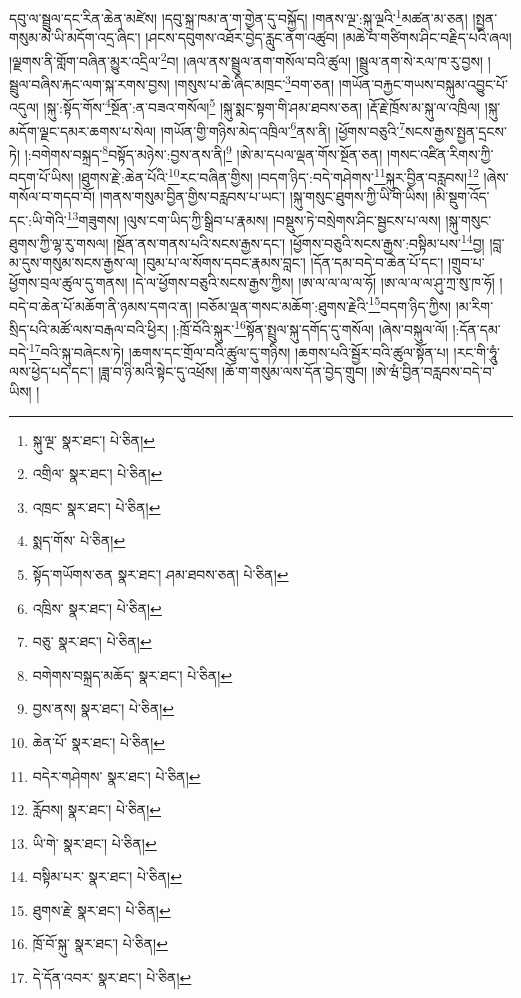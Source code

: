 དབུ་ལ་སྦྲུལ་དང་རིན་ཆེན་མཛེས། །དབུ་སྐྲ་ཁམ་ན་ག་གྱེན་དུ་བསྐྱོད། །གནས་ལྔ་:སྐུ་ལྔའི་\footnote{སྐུ་ལྔ་  སྣར་ཐང་།  པེ་ཅིན། }མཚན་མ་ཅན། །སྤྱན་གསུམ་མེ་ཡི་མདོག་འདྲ་ཞིང་། །ཤངས་དབུགས་འཐོར་བྱེད་རླུང་ནག་འཚུབ། །མཆེ་བ་གཙིགས་ཤིང་བརྗིད་པའི་ཞལ། །ལྗགས་ནི་གློག་བཞིན་མྱུར་འདྲིལ་\footnote{འགྲིལ་  སྣར་ཐང་།  པེ་ཅིན། }བ། །ཞལ་ནས་སྦྲུལ་ནག་གསོལ་བའི་ཚུལ། །སྦྲུལ་ནག་སེ་རལ་ཁ་རུ་བྱས། །སྦྲུལ་བཞིས་རྐང་ལག་སྐ་རགས་བྱས། །གསུས་པ་ཆེ་ཞིང་མཁྲང་\footnote{འཁྲང་  སྣར་ཐང་།  པེ་ཅིན། }བག་ཅན། །གཡོན་བརྐྱང་གཡས་བསྐུམ་འབྱུང་པོ་འདུལ། །སྐུ་:སྟོད་གོས་\footnote{སྨད་གོས་  པེ་ཅིན། }སྔོན་:ན་བཟའ་གསོལ།\footnote{སྟོད་གཡོགས་ཅན  སྣར་ཐང་། ཤམ་ཐབས་ཅན།  པེ་ཅིན། } །སྐུ་སྨང་སྟག་གི་ཤམ་ཐབས་ཅན། །རྡོ་རྗེ་ཁྲོས་མ་སྐུ་ལ་འཁྲིལ། །སྐུ་མདོག་ལྗང་དམར་ཆགས་པ་སེལ། །གཡོན་གྱི་གཉིས་མེད་འཁྲིལ་\footnote{འཁྲིས་  སྣར་ཐང་།  པེ་ཅིན། }ནས་ནི། །ཕྱོགས་བཅུའི་\footnote{བཅུ་  སྣར་ཐང་།  པེ་ཅིན། }སངས་རྒྱས་སྤྱན་དྲངས་ཏེ། །:བགེགས་བསྐྲད་\footnote{བགེགས་བསྐྲད་མཆོད་  སྣར་ཐང་།  པེ་ཅིན། }བསྟོད་མཉེས་:བྱས་ནས་ནི།\footnote{བྱས་ནས།  སྣར་ཐང་།  པེ་ཅིན། } །ཨེ་མ་དཔལ་ལྡན་གོས་སྔོན་ཅན། །གསང་འཛིན་རིགས་ཀྱི་བདག་པོ་ཡིས། །ཐུགས་རྗེ་:ཆེན་པོའི་\footnote{ཆེན་པོ་  སྣར་ཐང་།  པེ་ཅིན། }རང་བཞིན་གྱིས། །བདག་ཉིད་:བདེ་གཤེགས་\footnote{བདེར་གཤེགས་  སྣར་ཐང་།  པེ་ཅིན། }སྐུར་བྱིན་བརླབས།\footnote{རློབས།  སྣར་ཐང་།  པེ་ཅིན། } །ཞེས་གསོལ་བ་གདབ་བོ། །གནས་གསུམ་བྱིན་གྱིས་བརླབས་པ་ཡང་། །སྐུ་གསུང་ཐུགས་ཀྱི་ཡི་གེ་ཡིས། །མི་སྡུག་འོད་དང་:ཡི་གེའི་\footnote{ཡི་གེ་  སྣར་ཐང་།  པེ་ཅིན། }གཟུགས། །ལུས་ངག་ཡིད་ཀྱི་སྒྲིབ་པ་རྣམས། །བསྡུས་ཏེ་བསྲེགས་ཤིང་སྦྱངས་པ་ལས། །སྐུ་གསུང་ཐུགས་ཀྱི་ལྷ་རུ་གསལ། །སྔོན་ནས་གནས་པའི་སངས་རྒྱས་དང་། །ཕྱོགས་བཅུའི་སངས་རྒྱས་:བསྟིམ་པས་\footnote{བསྟིམ་པར་  སྣར་ཐང་།  པེ་ཅིན། }བྱ། །བླ་མ་དུས་གསུམ་སངས་རྒྱས་ལ། །བུམ་པ་ལ་སོགས་དབང་རྣམས་བླང་། །དོན་དམ་བདེ་བ་ཆེན་པོ་དང་། །གྲུབ་པ་ཕྱོགས་བྲལ་ཚུལ་དུ་གནས། །དེ་ལ་ཕྱོགས་བཅུའི་སངས་རྒྱས་ཀྱིས། །ཨ་ལ་ལ་ལ་ལ་ཧོ། །ཨ་ལ་ལ་ལ་ཤུ་ཀྲ་སུ་ཁ་ཧོ། །བདེ་བ་ཆེན་པོ་མཆོག་ནི་ཉམས་དགའ་ན། །བཅོམ་ལྡན་གསང་མཆོག་:ཐུགས་རྗེའི་\footnote{ཐུགས་རྗེ་  སྣར་ཐང་།  པེ་ཅིན། }བདག་ཉིད་ཀྱིས། །མ་རིག་སྲིད་པའི་མཚོ་ལས་བརྒལ་བའི་ཕྱིར། །:ཁྲོ་བོའི་སྐུར་\footnote{ཁྲོ་བོ་སྐུ་  སྣར་ཐང་།  པེ་ཅིན། }སྟོན་སྤྲུལ་སྐུ་དགོད་དུ་གསོལ། །ཞེས་བསྐུལ་ལོ། །:དོན་དམ་བདེ་\footnote{དེ་དོན་འབར་  སྣར་ཐང་།  པེ་ཅིན། }བའི་སྐུ་བཞེངས་ཏེ། །ཆགས་དང་གྲོལ་བའི་ཚུལ་དུ་གཉིས། །ཆགས་པའི་སྦྱོར་བའི་ཚུལ་སྟོན་པ། །རང་གི་ཧཱུཾ་ལས་ཕྱེད་པད་དང་། །ཟླ་བ་ཉི་མའི་སྟེང་དུ་འཕྲོས། །ཆོ་ག་གསུམ་ལས་དོན་བྱེད་གྲུབ། །ཨེ་ཝཾ་བྱིན་བརླབས་བདེ་བ་ཡིས། །
